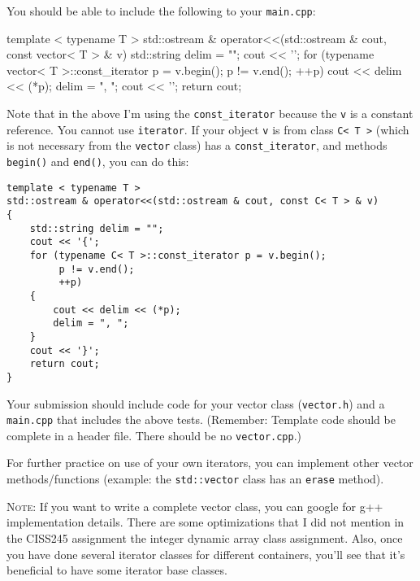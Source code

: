 You should be able to include
the following to your \verb!main.cpp!:
\begin{console}[fontsize=\footnotesize]
template < typename T >
std::ostream & operator<<(std::ostream & cout, const vector< T > & v)
{
    std::string delim = "";
    cout << '{';
    for (typename vector< T >::const_iterator p = v.begin();
         p != v.end();
         ++p)
    {
        cout << delim << (*p);
        delim = ", ";
    }
    cout << '}';
    return cout;
}
\end{console}
Note that in the above I'm using the \verb!const_iterator! because the
\verb!v! is a constant reference.
You cannot use \verb!iterator!.
If your object \verb!v! is from class \texttt{C< T >}
(which is not necessary from the \verb!vector! class)
has a \texttt{const\_iterator}, and methods
\verb!begin()! and \verb!end()!, you can do this:
\begin{Verbatim}[frame=single,fontsize=\footnotesize,commandchars=\~\#\@]
template < typename T >
std::ostream & operator<<(std::ostream & cout, const C< T > & v)
{
    std::string delim = "";
    cout << '{';
    for (typename C< T >::const_iterator p = v.begin();
         p != v.end();
         ++p)
    {
        cout << delim << (*p);
        delim = ", ";
    }
    cout << '}';
    return cout;
}
\end{Verbatim}


Your submission should include code for your vector class (\verb!vector.h!)
and a \verb!main.cpp! that includes the above tests.
(Remember: Template code should be complete in a header file.
There should be no \verb!vector.cpp!.)

For further practice on use of your own iterators, you can
implement other vector methods/functions (example:
the \verb!std::vector! class has an \verb!erase! method).

\textsc{Note}:
If you want to write a complete vector class, you can google for
g++ implementation details. There are some optimizations
that I did not mention in the CISS245 assignment the
integer dynamic array class assignment.
Also, once you have done several iterator classes for different containers,
you'll see that it's beneficial to have some iterator base classes.
